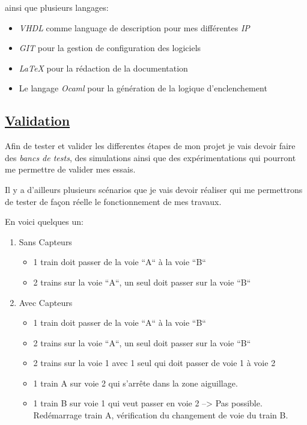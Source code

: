 ainsi que plusieurs langages:
\begin{itemize}
  \item \emph{VHDL}\cite{VHDL} comme language de description pour mes diff\'erentes
    \emph{IP}
  \item \emph{GIT}\cite{GIT} pour la gestion de configuration des logiciels
  \item \emph{\LaTeX}\cite{LATEX} pour la r\'edaction de la documentation
  \item Le langage \emph{Ocaml}\cite{OCAML} pour la g\'en\'eration de la logique d'enclenchement
\end{itemize}


\subsection{\underline{ Validation}}
\label{sec:valid}

Afin de tester et valider les differentes \'etapes de mon projet je vais
devoir faire des \emph{bancs de tests}, des simulations ainsi que des
exp\'erimentations qui pourront me permettre de valider mes essais.

Il y a d'ailleurs plusieurs sc\'enarios que je vais devoir r\'ealiser qui
me permettrons de tester de façon r\'eelle le fonctionnement de mes travaux.

En voici quelques un:

\begin{enumerate}[A]
  \item Sans Capteurs
  \begin{itemize}
    \item 1 train doit passer de la voie ``A`` à la voie ``B``
    \item 2 trains sur la voie ``A``, un seul doit passer sur la voie
       ``B``
  \end{itemize}

  \item Avec Capteurs
  \begin{itemize}
    \item 1 train doit passer de la voie ``A`` à la voie ``B``
    \item 2 trains sur la voie ``A``, un seul doit passer sur la voie ``B``
    \item 2 trains sur la voie 1 avec 1 seul qui doit passer de voie 1 à voie 2
    \item 1 train A sur voie 2 qui s'arrête dans la zone aiguillage.
    \item 1 train B sur voie 1 qui veut passer en voie 2 --> Pas
       possible. Red\'emarrage train A, v\'erification du changement de
       voie du train B.
  \end{itemize}
\end{enumerate}

